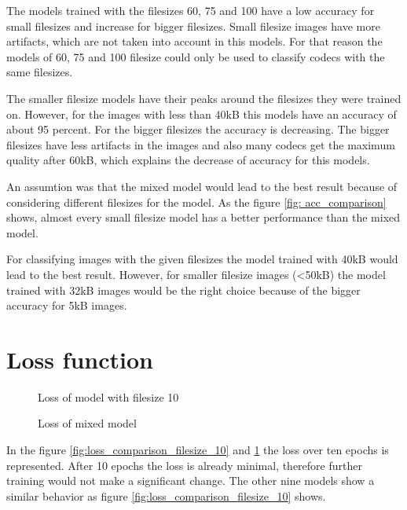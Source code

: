 \noindent
The models trained with the filesizes 60, 75 and 100 have a low accuracy for small filesizes and increase for bigger filesizes. Small filesize images have more artifacts, which are not taken into account in this models. For that reason the models of 60, 75 and 100 filesize could only be used to classify codecs with the same filesizes.

\noindent
The smaller filesize models have their peaks around the filesizes they were trained on. However, for the images with less than 40kB this models have an accuracy of about 95 percent. For the bigger filesizes the accuracy is decreasing. The bigger filesizes have less artifacts in the images and also many codecs get the maximum quality after 60kB, which explains the decrease of accuracy for this models.

\noindent
An assumtion was that the mixed model would lead to the best result because of considering different filesizes for the model. As the figure \ref{fig: acc_comparison} shows, almost every small filesize model has a better performance than the mixed model.

\noindent
For classifying images with the given filesizes the model trained with 40kB would lead to the best result. However, for smaller filesize images (\textless 50kB) the model trained with 32kB images would be the right choice because of the bigger accuracy for 5kB images.

\section{Loss function}

\begin{figure}[h!]
    \centering
    \begin{minipage}{0.7\textwidth}
        \centering
        \resizebox{\textwidth}{!}{}
         \caption{Loss of model with filesize 10}
         \label{fig:loss_comparison_filesize_10}
     \end{minipage}\hfill
     \begin{minipage}{0.7\textwidth}
         \centering
         \resizebox{\textwidth}{!}{}
         \caption{Loss of mixed model}
         \label{fig:loss_comparison_filesize_mixed}
    \end{minipage}
\end{figure}

\noindent
In the figure \ref{fig:loss_comparison_filesize_10} and \ref{fig:loss_comparison_filesize_mixed} the loss over ten epochs is represented. After 10 epochs the loss is already minimal, therefore further training would not make a significant change. The other nine models show a similar behavior as figure \ref{fig:loss_comparison_filesize_10} shows.


\printbibliography

